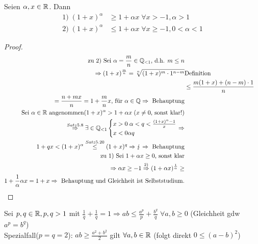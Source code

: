\begin{satz}
	Seien $\alpha, x \in \mathbb{R}$. Dann\\
	\begin{align*}
	1)\;(1+x)^{\alpha} &\geq 1 + \alpha x \; \forall x > -1, \alpha > 1\\
	2)\; (1+x)^{\alpha} &\leq 1+\alpha x \; \forall x \geq -1, 0 < \alpha < 1
	\end{align*}
\end{satz}

\begin{proof} %
	\begin{align*}
	\text{zu 2) Sei }\alpha =\frac{m}{n} \in \ratio_{<1}\text{, d.h. } m\leq n& &\\
	\Rightarrow (1+x)^\frac{m}{n} = \sqrt[n]{(1+x)^m\cdot1^{n-m}}& \text{Definition}\\ &\leq \frac{m(1+x)+(n-m)\cdot1}{n}&\\ =\frac{n + mx}{n} = 1 + \frac{m}{n}x
	\text{, für } \alpha \in \ratio \beha\\
	\text{Sei } \alpha \in \real \text{ angenommen} (1+x)^{\alpha} > 1 + \alpha x\; (x\neq 0 \text{, sonst klar!})\\ \overset{Satz 5.8}{\Rightarrow} \exists \in \ratio_{<1} 
	\begin{cases*}
	x > 0\;\alpha<q< \frac{(1+x)^{\alpha}-1}{x}\\
	x < 0 \alpha q 
	\end{cases*} 
	\Rightarrow\\ 1+qx < (1+x)^{\alpha} \overset{Satz 5.20}{\leq} (1+x)^q \Rightarrow \lightning \beha\\ %
	\text{zu 1) Sei } 1+\alpha x \geq 0 \text{, sonst klar}\\
	\Rightarrow \alpha x \geq -1 \overset{2)}{\Rightarrow} (1+\alpha x)^{\frac{1}{\alpha}} \geq\\ 1 +\frac{1}{\alpha}\alpha x = 1 +x \Rightarrow \text{ Behauptung und Gleichheit ist Selbststudium.}
	\end{align*}\QEDA
\end{proof}

\begin{satz}
	Sei $p,q \in \mathbb{R}, p,q>1$ mit $\frac{1}{q} + \frac{1}{q} =1 \Rightarrow ab \leq \frac{a^p}{p}+\frac{b^q}{q}\;\forall a,b \geq 0$ (Gleichheit gdw $a^p = b^q$)\\
	Spezialfall($p=q=2$): $ab \geq \frac{a^2 + b^2}{2}$ gilt $\forall a,b \in \mathbb{R}$ (folgt direkt $0\leq (a-b)^2$)
\end{satz}

